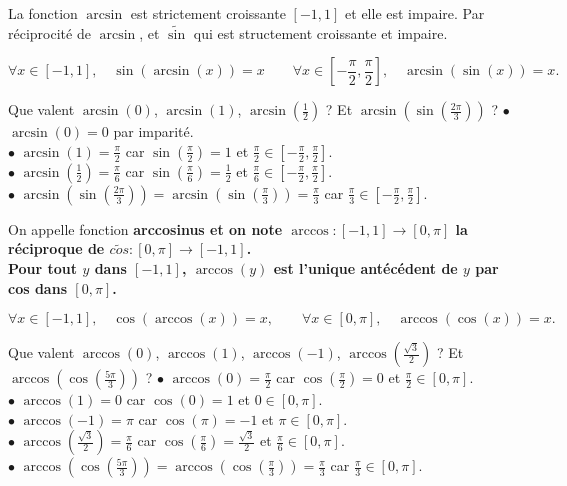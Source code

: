 \documentclass[11pt]{article}
\begin{document}
\begin{prop}{}{}
    La fonction $\arcsin$ est strictement croissante $[-1,1]$ et elle est impaire.
    \tcblower
    Par réciprocité de $\arcsin$, et $\tilde{\sin}$ qui est structement croissante et impaire.
\end{prop}

\begin{prop}{}{}
    \begin{equation*}
        \forall x \in [-1,1],\quad \sin(\arcsin(x))=x\qquad\forall x\in[-\frac{\pi}{2},\frac{\pi}{2}],\quad\arcsin(\sin(x))=x.
    \end{equation*}
\end{prop}

\begin{ex}{}{}
    Que valent $\arcsin(0)$, $\arcsin(1)$, $\arcsin(\frac{1}{2})$ ? Et $\arcsin(\sin(\frac{2\pi}{3}))$ ?
    \tcblower
    $\bullet$ $\arcsin(0)=0$ par imparité.\\
    $\bullet$ $\arcsin(1)=\frac{\pi}{2}$ car $\sin(\frac{\pi}{2})=1$ et $\frac{\pi}{2}\in[-\frac{\pi}{2},\frac{\pi}{2}]$.\\
    $\bullet$ $\arcsin(\frac{1}{2})=\frac{\pi}{6}$ car $\sin(\frac{\pi}{6})=\frac{1}{2}$ et $\frac{\pi}{6}\in[-\frac{\pi}{2},\frac{\pi}{2}]$.\\
    $\bullet$ $\arcsin(\sin(\frac{2\pi}{3}))=\arcsin(\sin(\frac{\pi}{3}))=\frac{\pi}{3}$ car $\frac{\pi}{3}\in[-\frac{\pi}{2},\frac{\pi}{2}]$.
\end{ex}



\begin{defi}{}{}
    On appelle fonction \bf{arccosinus} et on note $\arccos:[-1,1]\to[0,\pi]$ la réciproque de $\tilde{cos}:[0,\pi]\to[-1,1]$.\\
    Pour tout $y$ dans $[-1,1]$, $\arccos(y)$ est l'unique antécédent de $y$ par cos dans $[0,\pi]$.
\end{defi}

\begin{prop}{}{}
    \begin{equation*}
        \forall x \in [-1,1],\quad\cos(\arccos(x))=x,\qquad\forall x\in[0,\pi],\quad\arccos(\cos(x))=x.
    \end{equation*}
\end{prop}

\begin{ex}{}{}
    Que valent $\arccos(0)$, $\arccos(1)$, $\arccos(-1)$, $\arccos(\frac{\sqrt{3}}{2})$ ? Et $\arccos(\cos(\frac{5\pi}{3}))$ ?
    \tcblower
    $\bullet$ $\arccos(0)=\frac{\pi}{2}$ car $\cos(\frac{\pi}{2})=0$ et $\frac{\pi}{2}\in[0,\pi]$.\\
    $\bullet$ $\arccos(1)=0$ car $\cos(0)=1$ et $0\in[0,\pi]$.\\
    $\bullet$ $\arccos(-1)=\pi$ car $\cos(\pi)=-1$ et $\pi\in[0,\pi]$.\\
    $\bullet$ $\arccos(\frac{\sqrt{3}}{2})=\frac{\pi}{6}$ car $\cos(\frac{\pi}{6})=\frac{\sqrt{3}}{2}$ et $\frac{\pi}{6}\in[0,\pi]$.\\
    $\bullet$ $\arccos(\cos(\frac{5\pi}{3}))=\arccos(\cos(\frac{\pi}{3}))=\frac{\pi}{3}$ car $\frac{\pi}{3}\in[0,\pi]$.
\end{ex}
\end{document}
